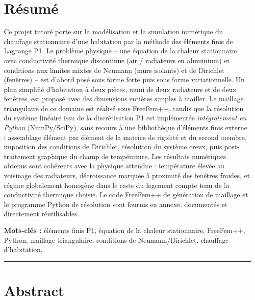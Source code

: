 \documentclass[12pt,a4paper]{article}
\begin{document}
	\section*{Résumé}
	
	Ce projet tutoré porte sur la modélisation et la simulation numérique du chauffage stationnaire d'une habitation par la méthode des éléments finis de Lagrange P1. Le problème physique -- une équation de la chaleur stationnaire avec conductivité thermique discontinue (air / radiateurs en aluminium) et conditions aux limites mixtes de Neumann (murs isolants) et de Dirichlet (fenêtres) -- est d'abord posé sous forme forte puis sous forme variationnelle. Un plan simplifié d'habitation à deux pièces, muni de deux radiateurs et de deux fenêtres, est proposé avec des dimensions entières simples à mailler. Le maillage triangulaire de ce domaine est réalisé sous FreeFem++, tandis que la résolution du système linéaire issu de la discrétisation P1 est implémentée \emph{intégralement en Python} (NumPy/SciPy), sans recours à une bibliothèque d'éléments finis externe : assemblage élément par élément de la matrice de rigidité et du second membre, imposition des conditions de Dirichlet, résolution du système creux, puis post-traitement graphique du champ de température. Les résultats numériques obtenus sont cohérents avec la physique attendue : température élevée au voisinage des radiateurs, décroissance marquée à proximité des fenêtres froides, et régime globalement homogène dans le reste du logement compte tenu de la conductivité thermique choisie. Le code FreeFem++ de génération de maillage et le programme Python de résolution sont fournis en annexe, documentés et directement réutilisables.
	
	\vspace{0.4cm}
	\noindent\textbf{Mots-clés :} éléments finis P1, équation de la chaleur stationnaire, FreeFem++, Python, maillage triangulaire, conditions de Neumann/Dirichlet, chauffage d'habitation.
	
	\vspace{0.8cm}
	\begin{center}\rule{0.4\linewidth}{0.3pt}\end{center}
	\vspace{0.4cm}
	
	\section*{Abstract}
	
\end{document}
